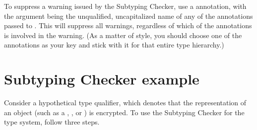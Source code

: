 To suppress a warning issued by the Subtyping Checker, use a
annotation, with the argument being the unqualified, uncapitalized name of
any of the annotations passed to .  This will suppress all
warnings, regardless of which of the annotations is involved in the
warning.  (As a matter of style, you should choose one of the annotations
as your  key and stick with it for that entire type
hierarchy.)


\section{Subtyping Checker example\label{subtyping-example}\label{encrypted-example}}

Consider a hypothetical  type qualifier, which denotes that the
representation of an object (such as a , , or
) is encrypted. To use the Subtyping Checker for the 
type system, follow three steps.

